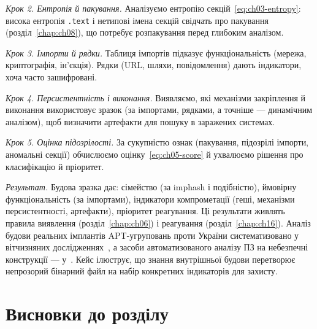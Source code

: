 \emph{Крок 2. Ентропія й пакування.} Аналізуємо ентропію секцій~\eqref{eq:ch03-entropy}: висока ентропія \texttt{.text} і нетипові імена секцій свідчать про пакування (розділ~\ref{chap:ch08}), що потребує розпакування перед глибоким аналізом.

\emph{Крок 3. Імпорти й рядки.} Таблиця імпортів підказує функціональність (мережа, криптографія, ін'єкція). Рядки (URL, шляхи, повідомлення) дають індикатори, хоча часто зашифровані.

\emph{Крок 4. Персистентність і виконання.} Виявляємо, які механізми закріплення й виконання використовує зразок (за імпортами, рядками, а точніше --- динамічним аналізом), щоб визначити артефакти для пошуку в заражених системах.

\emph{Крок 5. Оцінка підозрілості.} За сукупністю ознак (пакування, підозрілі імпорти, аномальні секції) обчислюємо оцінку~\eqref{eq:ch05-score} й ухвалюємо рішення про класифікацію й пріоритет.

\emph{Результат.} Будова зразка дає: сімейство (за imphash і подібністю), ймовірну функціональність (за імпортами), індикатори компрометації (геші, механізми персистентності, артефакти), пріоритет реагування. Ці результати живлять правила виявлення (розділ~\ref{chap:ch06}) і реагування (розділ~\ref{chap:ch16}). Аналіз будови реальних імплантів APT-угруповань проти України систематизовано у вітчизняних дослідженнях~\cite{ch01:apt-ua}, а засоби автоматизованого аналізу ПЗ на небезпечні конструкції --- у~\cite{ch05:windows-vuln}. Кейс ілюструє, що знання внутрішньої будови перетворює непрозорий бінарний файл на набір конкретних індикаторів для захисту.

\section*{Висновки до розділу}

